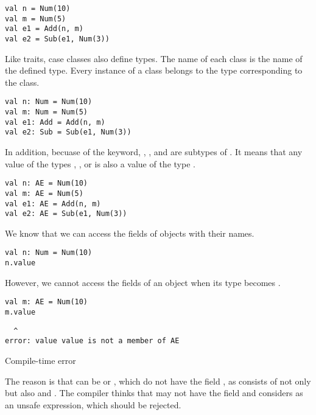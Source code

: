 \begin{verbatim}
val n = Num(10)
val m = Num(5)
val e1 = Add(n, m)
val e2 = Sub(e1, Num(3))
\end{verbatim}

Like traits, case classes also define types. The name of each class is the name
of the defined type. Every instance of a class belongs to the type corresponding
to the class.

\begin{verbatim}
val n: Num = Num(10)
val m: Num = Num(5)
val e1: Add = Add(n, m)
val e2: Sub = Sub(e1, Num(3))
\end{verbatim}

In addition, becuase of the  keyword, , , and
 are subtypes of . It means that any value of the types
, , or  is also a value of the type .

\begin{verbatim}
val n: AE = Num(10)
val m: AE = Num(5)
val e1: AE = Add(n, m)
val e2: AE = Sub(e1, Num(3))
\end{verbatim}

We know that we can access the fields of objects with their names.

\begin{verbatim}
val n: Num = Num(10)
n.value
\end{verbatim}

However, we cannot access the fields of an object when its type becomes .

\begin{verbatim}
val m: AE = Num(10)
m.value
\end{verbatim}
\vspace{-1em}
\begin{mdframed}[hidealllines=true,backgroundcolor=red!10,innerleftmargin=3pt,innerrightmargin=3pt,leftmargin=-3pt,rightmargin=-3pt]
\begin{verbatim}
  ^
error: value value is not a member of AE
\end{verbatim}
\vspace{-2em}
\begin{flushright}
\scriptsize\textsf{Compile-time error}
\end{flushright}
\end{mdframed}

The reason is that  can be  or , which do not have
the field , as  consists of not only  but also
 and . The compiler thinks that  may not have the
field  and considers  as an unsafe expression, which
should be rejected.

